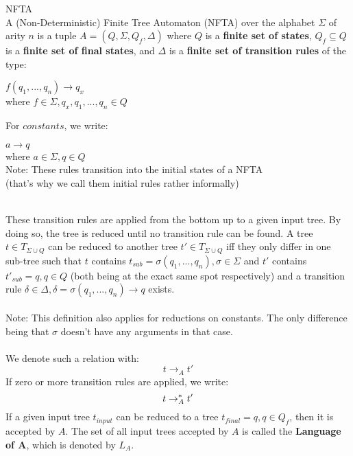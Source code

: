 \documentclass{llncs}
\begin{document}
\begin{definition}{NFTA \cite{tata-nfta}}
	\\
	A (Non-Deterministic) Finite Tree Automaton (NFTA) over the alphabet \(\Sigma\) of arity \(n\) is a tuple \(A = (Q, \Sigma, Q_f ,\Delta)\) where
	\(Q\) is a \textbf{finite set of states}, \(Q_f \subseteq Q\) is a  \textbf{finite set of final states}, and \(\Delta\) is a \textbf{finite set of transition rules} of the type:
	
	\begin{center}
		\(f(q_1,...,q_n) \rightarrow q_x\) \\
		where \(f \in \Sigma, q_x, q_1,...,q_n \in Q \)
	\end{center}
	For \(constants\), we write:
	\begin{center}
		\(a \rightarrow q\) \\
		where  \(a \in \Sigma, q \in Q \) \\
		Note: These rules transition into the initial states of a NFTA
		\\(that's why we call them initial rules rather informally)
	\end{center}
	~\\
	These transition rules are applied from the bottom up to a given input tree. By doing so, the tree is reduced until no transition rule can be found. A tree $t \in T_{\Sigma \cup Q}$ can be reduced to another tree $t' \in T_{\Sigma \cup Q}$ iff they only differ in one sub-tree such that \(t\) contains \(t_{sub}  = \sigma(q_1,..., q_n), \sigma \in \Sigma\) and \(t'\) contains \(t'_{sub} = q, q \in Q\) (both being at the exact same spot respectively) and a transition rule \(\delta \in \Delta, \delta = \sigma(q_1,..., q_n) \rightarrow q\) exists.
	\\
	\\
	Note: This definition also applies for reductions on constants. The only difference being that \(\sigma\) doesn't have any arguments in that case.
	\\\\
	We denote such a relation with:
		$$t \rightarrow_A t'$$
	If zero or more transition rules are applied, we write:
		$$t \rightarrow_A^* t'$$
	If a given input tree \(t_{input}\) can be reduced to a tree \(t_{final} = q, q \in Q_f\), then it is accepted by \(A\). The set of all input trees accepted by \(A\) is called the \textbf{Language of A}, which is denoted by \(L_A\).
\end{definition}

\pagebreak
\end{document}

